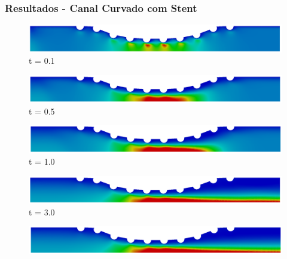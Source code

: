 
\begin{frame}
 \frametitle{\Large Resultados - Canal Curvado com Stent}
\begin{figure}
     \begin{minipage}{.50\linewidth}
      \centering
      \includegraphics[scale=0.08]{images/vel_CurvedStrut200.png}\\
      \scriptsize t = 0.1
     \end{minipage}%
     \begin{minipage}{.50\linewidth}
      \centering
      \includegraphics[scale=0.08]{images/vel_CurvedStrut1000.png}\\
      \scriptsize t = 0.5
     \end{minipage}
     \begin{minipage}{.50\linewidth}
     \medskip
      \centering
      \includegraphics[scale=0.08]{images/vel_CurvedStrut2000.png}\\
      \scriptsize t = 1.0
     \end{minipage}%
     \begin{minipage}{.50\linewidth}
     \medskip
      \centering
      \includegraphics[scale=0.08]{images/vel_CurvedStrut6000.png}\\
      \scriptsize t = 3.0
     \end{minipage}
     \begin{minipage}{.50\linewidth}
      \centering
      \includegraphics[scale=0.08]{images/vel_CurvedStrut8000.png}\\

\end{minipage}
\end{figure}
\end{frame}
